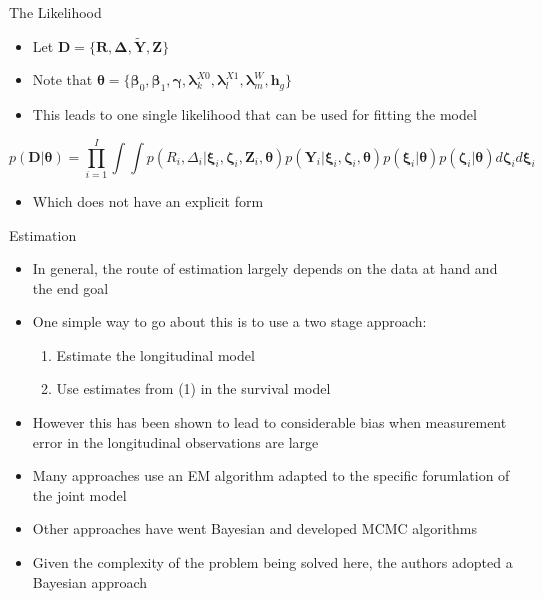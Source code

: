 \documentclass[
  ignorenonframetext,
]{beamer}
\providecommand{\tightlist}{%
  \setlength{\itemsep}{0pt}\setlength{\parskip}{0pt}}
\begin{document}
\begin{frame}{The Likelihood}
\protect\hypertarget{the-likelihood-1}{}
\begin{itemize}
\tightlist
\item
  Let
  \(\boldsymbol{D} = \lbrace \boldsymbol{R}, \boldsymbol{\Delta}, \tilde{\boldsymbol{Y}}, \boldsymbol{Z} \rbrace\)
\item
  Note that
  \(\boldsymbol{\theta} = \lbrace \boldsymbol{\beta}_0, \boldsymbol{\beta}_1, \boldsymbol{\gamma}, \boldsymbol{\lambda}_k^{X0}, \boldsymbol{\lambda}_l^{X1}, \boldsymbol{\lambda}_m^{W}, \boldsymbol{h}_g \rbrace\)
\item
  This leads to one single likelihood that can be used for fitting the
  model
\end{itemize}

\[
p(\boldsymbol{D} | \boldsymbol{\theta})= \prod_{i=1}^I \int \int p(R_i, \Delta_i | \boldsymbol{\xi}_i, \boldsymbol{\zeta}_i, \boldsymbol{Z}_i, \boldsymbol{\theta})p(\boldsymbol{Y}_i|\boldsymbol{\xi}_i, \boldsymbol{\zeta}_i, \boldsymbol{\theta})p(\boldsymbol{\xi}_i|\boldsymbol{\theta})p(\boldsymbol{\zeta}_i|\boldsymbol{\theta})d\boldsymbol{\zeta}_i d\boldsymbol{\xi}_i
\]

\begin{itemize}
\tightlist
\item
  Which does not have an explicit form
\end{itemize}
\end{frame}

\begin{frame}{Estimation}
\protect\hypertarget{estimation}{}
\begin{itemize}
\tightlist
\item
  In general, the route of estimation largely depends on the data at
  hand and the end goal
\item
  One simple way to go about this is to use a two stage approach:

  \begin{enumerate}
  \tightlist
  \item
    Estimate the longitudinal model
  \item
    Use estimates from (1) in the survival model
  \end{enumerate}
\item
  However this has been shown to lead to considerable bias when
  measurement error in the longitudinal observations are large
\item
  Many approaches use an EM algorithm adapted to the specific
  forumlation of the joint model
\item
  Other approaches have went Bayesian and developed MCMC algorithms
\item
  Given the complexity of the problem being solved here, the authors
  adopted a Bayesian approach
\end{itemize}
\end{frame}
\end{document}
